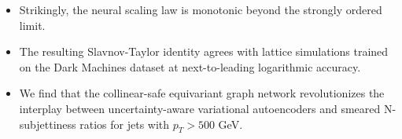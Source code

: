 \begin{itemize}
  \item Strikingly, the neural scaling law is monotonic beyond the strongly ordered limit.
  \item The resulting Slavnov-Taylor identity agrees with lattice simulations trained on the Dark Machines dataset at next-to-leading logarithmic accuracy.
  \item We find that the collinear-safe equivariant graph network revolutionizes the interplay between uncertainty-aware variational autoencoders and smeared N-subjettiness ratios for jets with $p_T > 500$ GeV.
\end{itemize}

